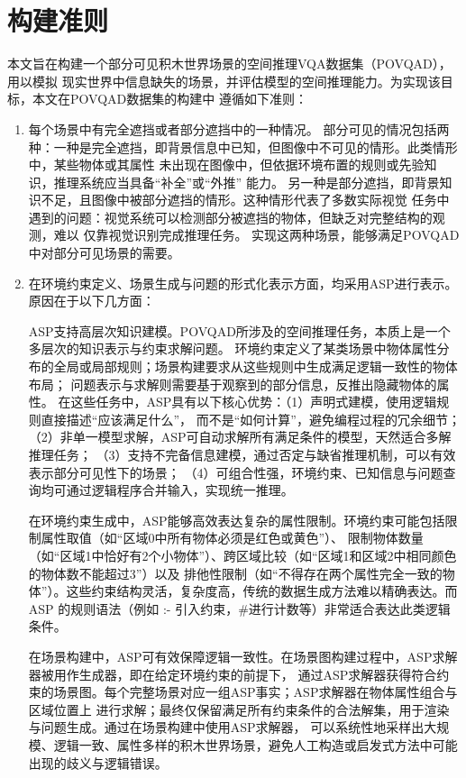 \section{构建准则}
本文旨在构建一个部分可见积木世界场景的空间推理VQA数据集（POVQAD），用以模拟
现实世界中信息缺失的场景，并评估模型的空间推理能力。为实现该目标，本文在POVQAD数据集的构建中
遵循如下准则：
\begin{enumerate}[nosep]
\item 每个场景中有完全遮挡或者部分遮挡中的一种情况。
部分可见的情况包括两种：一种是完全遮挡，即背景信息中已知，但图像中不可见的情形。此类情形中，某些物体或其属性
未出现在图像中，但依据环境布置的规则或先验知识，推理系统应当具备“补全”或“外推”
能力。
另一种是部分遮挡，即背景知识不足，且图像中被部分遮挡的情形。这种情形代表了多数实际视觉
任务中遇到的问题：视觉系统可以检测部分被遮挡的物体，但缺乏对完整结构的观测，难以
仅靠视觉识别完成推理任务。
实现这两种场景，能够满足POVQAD中对部分可见场景的需要。
\item 在环境约束定义、场景生成与问题的形式化表示方面，均采用ASP进行表示。原因在于以下几方面：

ASP支持高层次知识建模。POVQAD所涉及的空间推理任务，本质上是一个多层次的知识表示与约束求解问题。
环境约束定义了某类场景中物体属性分布的全局或局部规则；场景构建要求从这些规则中生成满足逻辑一致性的物体布局；
问题表示与求解则需要基于观察到的部分信息，反推出隐藏物体的属性。
在这些任务中，ASP具有以下核心优势：（1）声明式建模，使用逻辑规则直接描述“应该满足什么”，
而不是“如何计算”，避免编程过程的冗余细节；（2）非单一模型求解，ASP可自动求解所有满足条件的模型，天然适合多解推理任务；
（3）支持不完备信息建模，通过否定与缺省推理机制，可以有效表示部分可见性下的场景；
（4）可组合性强，环境约束、已知信息与问题查询均可通过逻辑程序合并输入，实现统一推理。

在环境约束生成中，ASP能够高效表达复杂的属性限制。环境约束可能包括限制属性取值（如“区域0中所有物体必须是红色或黄色”）、
限制物体数量（如“区域1中恰好有2个小物体”）、跨区域比较（如“区域1和区域2中相同颜色的物体数不能超过3”）以及
排他性限制（如“不得存在两个属性完全一致的物体”）。这些约束结构灵活，复杂度高，传统的数据生成方法难以精确表达。而 ASP 的规则语法（例如 :- 引入约束，\#进行计数等）非常适合表达此类逻辑条件。

在场景构建中，ASP可有效保障逻辑一致性。在场景图构建过程中，ASP求解器被用作生成器，即在给定环境约束的前提下，
通过ASP求解器获得符合约束的场景图。每个完整场景对应一组ASP事实；ASP求解器在物体属性组合与区域位置上
进行求解；最终仅保留满足所有约束条件的合法解集，用于渲染与问题生成。通过在场景构建中使用ASP求解器，
可以系统性地采样出大规模、逻辑一致、属性多样的积木世界场景，避免人工构造或启发式方法中可能出现的歧义与逻辑错误。


\end{enumerate}
